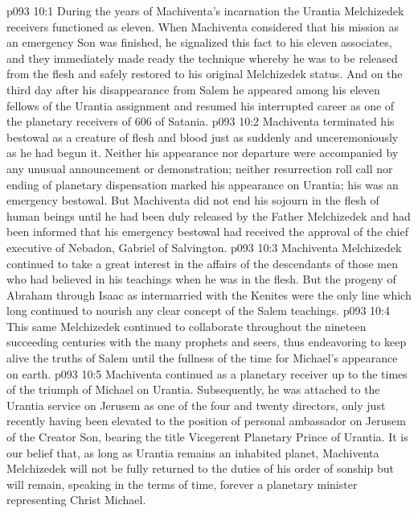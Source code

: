 \vs p093 10:1 During the years of Machiventa’s incarnation the Urantia Melchizedek receivers functioned as eleven. When Machiventa considered that his mission as an emergency Son was finished, he signalized this fact to his eleven associates, and they immediately made ready the technique whereby he was to be released from the flesh and safely restored to his original Melchizedek status. And on the third day after his disappearance from Salem he appeared among his eleven fellows of the Urantia assignment and resumed his interrupted career as one of the planetary receivers of 606 of Satania.
\vs p093 10:2 Machiventa terminated his bestowal as a creature of flesh and blood just as suddenly and unceremoniously as he had begun it. Neither his appearance nor departure were accompanied by any unusual announcement or demonstration; neither resurrection roll call nor ending of planetary dispensation marked his appearance on Urantia; his was an emergency bestowal. But Machiventa did not end his sojourn in the flesh of human beings until he had been duly released by the Father Melchizedek and had been informed that his emergency bestowal had received the approval of the chief executive of Nebadon, Gabriel of Salvington.
\vs p093 10:3 \pc Machiventa Melchizedek continued to take a great interest in the affairs of the descendants of those men who had believed in his teachings when he was in the flesh. But the progeny of Abraham through Isaac as intermarried with the Kenites were the only line which long continued to nourish any clear concept of the Salem teachings.
\vs p093 10:4 This same Melchizedek continued to collaborate throughout the nineteen succeeding centuries with the many prophets and seers, thus endeavoring to keep alive the truths of Salem until the fullness of the time for Michael’s appearance on earth.
\vs p093 10:5 Machiventa continued as a planetary receiver up to the times of the triumph of Michael on Urantia. Subsequently, he was attached to the Urantia service on Jerusem as one of the four and twenty directors, only just recently having been elevated to the position of personal ambassador on Jerusem of the Creator Son, bearing the title Vicegerent Planetary Prince of Urantia. It is our belief that, as long as Urantia remains an inhabited planet, Machiventa Melchizedek will not be fully returned to the duties of his order of sonship but will remain, speaking in the terms of time, forever a planetary minister representing Christ Michael.
